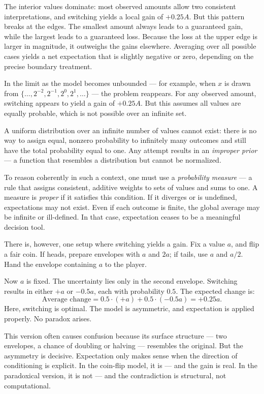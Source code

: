 The interior values dominate: most observed amounts allow two consistent interpretations, and switching yields a local gain of \( +0.25A \). But this pattern breaks at the edges. The smallest amount always leads to a guaranteed gain, while the largest leads to a guaranteed loss. Because the loss at the upper edge is larger in magnitude, it outweighs the gains elsewhere. Averaging over all possible cases yields a net expectation that is slightly negative or zero, depending on the precise boundary treatment.

In the limit as the model becomes unbounded — for example, when \( x \) is drawn from \( \{\dots, 2^{-2}, 2^{-1}, 2^0, 2^1, \dots\} \) — the problem reappears. For any observed amount, switching appears to yield a gain of \( +0.25A \). But this assumes all values are equally probable, which is not possible over an infinite set.

A uniform distribution over an infinite number of values cannot exist: there is no way to assign equal, nonzero probability to infinitely many outcomes and still have the total probability equal to one. Any attempt results in an \emph{improper prior} — a function that resembles a distribution but cannot be normalized.

To reason coherently in such a context, one must use a \emph{probability measure} — a rule that assigns consistent, additive weights to sets of values and sums to one. A measure is \emph{proper} if it satisfies this condition. If it diverges or is undefined, expectations may not exist. Even if each outcome is finite, the global average may be infinite or ill-defined. In that case, expectation ceases to be a meaningful decision tool.

There is, however, one setup where switching yields a gain. Fix a value \( a \), and flip a fair coin. If heads, prepare envelopes with \( a \) and \( 2a \); if tails, use \( a \) and \( a/2 \). Hand the envelope containing \( a \) to the player.

Now \( a \) is fixed. The uncertainty lies only in the second envelope. Switching results in either \( +a \) or \( -0.5a \), each with probability \( 0.5 \). The expected change is:
\[
\text{Average change} = 0.5 \cdot (+a) + 0.5 \cdot (-0.5a) = +0.25a.
\]
Here, switching is optimal. The model is asymmetric, and expectation is applied properly. No paradox arises.

This version often causes confusion because its surface structure — two envelopes, a chance of doubling or halving — resembles the original. But the asymmetry is decisive. Expectation only makes sense when the direction of conditioning is explicit. In the coin-flip model, it is — and the gain is real. In the paradoxical version, it is not — and the contradiction is structural, not computational.


